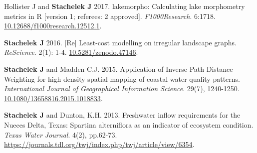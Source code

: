 \documentclass[11pt]{article}
\makeatletter
\newlength{\bibhang}
\newlength{\bibsep}
 {\@listi \global\bibsep\itemsep \global\advance\bibsep by\parsep}
\newenvironment{bibenum*}
  {\renewcommand\labelenumi{[\theenumi]}%
   \etaremune[
     topsep=0pt,
     itemsep=\bibsep,
     parsep=0pt,partopsep=0pt,
     itemindent=-\bibhang,
     leftmargin=0.8em
     ]
     }
  {\endetaremune}
\renewcommand{\section}[1]{\pagebreak[3]%
    \vspace{1.3\baselineskip}%
    \phantomsection\addcontentsline{toc}{section}{#1}%
    \noindent\llap{\scshape\smash{\parbox[t]{\marginparwidth}{\hyphenpenalty=10000\raggedright #1}}}%
    \vspace{-\baselineskip}\par}
\makeatother
\begin{document}
\begin{bibenum*}
    \item Hollister J and \textbf{Stachelek J} 2017. lakemorpho: Calculating lake morphometry metrics in R [version 1; referees: 2 approved]. \emph{F1000Research}. 6:1718. \href{https://doi.org/10.12688/f1000research.12512.1}{10.12688/f1000research.12512.1}.

    \item \textbf{Stachelek J} 2016. [Re] Least-cost modelling on irregular landscape graphs. \emph{ReScience}. 2(1): 1-4. \href{https://github.com/ReScience-Archives/Stachelek-2016/raw/master/article/article.pdf}{10.5281/zenodo.47146}.

    \item \textbf{Stachelek J} and Madden C.J. 2015. Application of Inverse Path Distance Weighting for high density spatial mapping of coastal water quality patterns. \emph{International Journal of Geographical Information Science}. 29(7), 1240-1250. \href{https://doi.org/10.1080/13658816.2015.1018833}{10.1080/13658816.2015.1018833}.

    \item \textbf{Stachelek J} and Dunton, K.H. 2013. Freshwater inflow requirements for the Nueces Delta, Texas: Spartina alterniflora as an indicator of ecosystem condition. \emph{Texas Water Journal}. 4(2), pp.62-73. \href{https://journals.tdl.org/twj/index.php/twj/article/view/6354}{https://journals.tdl.org/twj/index.php/twj/article/view/6354}.


\end{bibenum*}

\vspace{0.1in}


% 
\end{document}
